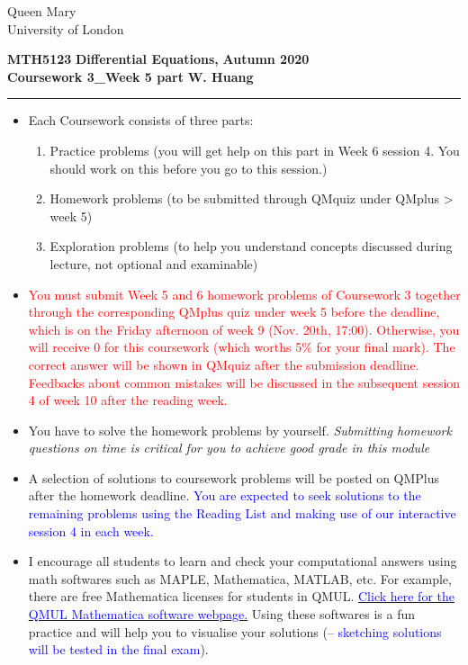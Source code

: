 \documentclass[11pt,a4paper,twoside]{article}
\begin{document}
	\begin{singlespace}
		\begin{center}
			\Huge Queen Mary\\
			\LARGE University of London
		\end{center}
		\Large \textbf{MTH5123} \hfill \Large \textbf{Differential Equations,} \hfill \Large \textbf{Autumn 2020}\\
		\large \textbf{Coursework 3\_Week 5 part} \hfill \large \textbf{W. Huang}
		\rule{\textwidth}{0.4pt}
	\end{singlespace}
	\begin{itemize}
		\item Each Coursework consists of three parts:
		\begin{enumerate}[\bfseries I.]
			\item Practice problems (you will get help on this part in Week 6 session 4. You should work on this before you go to this session.)
			\item Homework problems (to be submitted through QMquiz under QMplus > week 5)
			\item Exploration problems (to help you understand concepts discussed during lecture, not optional and examinable)
		\end{enumerate}
		\item \textcolor{red}{You must submit Week 5 and 6 homework problems of Coursework 3 together through the corresponding QMplus quiz under week 5 before the deadline, which is on the Friday afternoon of week 9 (Nov. 20th, 17:00). Otherwise, you will receive 0 for this coursework (which worths 5\% for your final mark). The correct answer will be shown in QMquiz after the submission deadline. Feedbacks about common mistakes will be discussed in the subsequent session 4 of week 10 after the reading week.}
		\item You have to solve the homework problems by yourself. \textit{Submitting homework questions on time is critical for you to achieve good grade in this module}
		\item A selection of solutions to coursework problems will be posted on QMPlus after the homework deadline. \textcolor{blue}{You are expected to seek solutions to the remaining problems using the Reading List and making use of our interactive session 4 in each week.}
		\item I encourage all students to learn and check your computational answers using math softwares such as MAPLE, Mathematica, MATLAB, etc. For example, there are free Mathematica licenses for students in QMUL. \href{https://www.its.qmul.ac.uk/services/service-catalogue/items/software---computational-mathematica.html}{\textcolor{blue}{Click here for the QMUL Mathematica software webpage.}} Using these softwares is a fun practice and will help you to visualise your solutions (– \textcolor{blue}{sketching solutions will be tested in the final exam}).
	\end{itemize}
\end{document}
